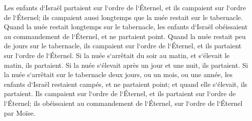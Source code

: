 \verse Les enfants d`Israël partaient sur l`ordre de l`Éternel, et ils campaient sur l`ordre de l`Éternel; ils campaient aussi longtemps que la nuée restait sur le tabernacle. 
\verse Quand la nuée restait longtemps sur le tabernacle, les enfants d`Israël obéissaient au commandement de l`Éternel, et ne partaient point. 
\verse Quand la nuée restait peu de jours sur le tabernacle, ils campaient sur l`ordre de l`Éternel, et ils partaient sur l`ordre de l`Éternel. 
\verse Si la nuée s`arrêtait du soir au matin, et s`élevait le matin, ils partaient. Si la nuée s`élevait après un jour et une nuit, ils partaient. 
\verse Si la nuée s`arrêtait sur le tabernacle deux jours, ou un mois, ou une année, les enfants d`Israël restaient campés, et ne partaient point; et quand elle s`élevait, ils partaient. 
\verse Ils campaient sur l`ordre de l`Éternel, et ils partaient sur l`ordre de l`Éternel; ils obéissaient au commandement de l`Éternel, sur l`ordre de l`Éternel par Moïse. 

